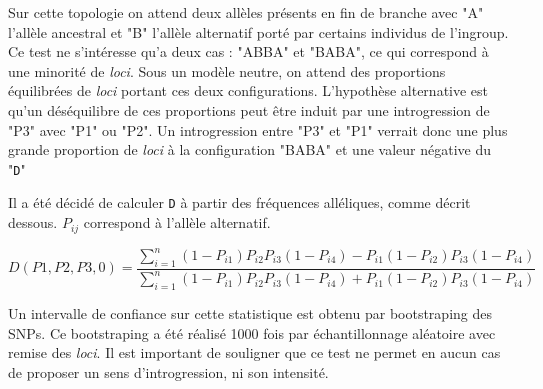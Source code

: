 Sur cette topologie on attend deux allèles présents en fin de branche avec "A" l'allèle ancestral et "B" l'allèle alternatif porté par certains individus de l'ingroup.
 Ce test ne s'intéresse qu'a deux cas : "ABBA" et "BABA", ce qui correspond à une minorité de \textit{loci}. Sous un modèle neutre, on attend des proportions équilibrées de \textit{loci} portant ces deux configurations. L'hypothèse alternative est qu'un déséquilibre de ces proportions peut être induit par une introgression de "P3" avec "P1" ou "P2".
 Un introgression entre "P3" et "P1" verrait donc une plus grande proportion de \textit{loci} à la configuration "BABA" et une valeur négative du "\verb|D|"



Il a été décidé de calculer \verb|D| à partir des fréquences alléliques, comme décrit dessous.
 \textit{$P_{ij}$} correspond à l'allèle alternatif.

\[D(P1,P2,P3,0)=\frac{\sum_{i=1}^{n} (1-P_{i1})P_{i2}P_{i3}(1-P_{i4})-P_{i1}(1-P_{i2})P_{i3}(1-P_{i4})}{\sum_{i=1}^{n} (1-P_{i1})P_{i2}P_{i3}(1-P_{i4})+P_{i1}(1-P_{i2})P_{i3}(1-P_{i4})}\]

Un intervalle de confiance sur cette statistique est obtenu par bootstraping des SNPs.  Ce bootstraping a été réalisé 1000 fois par échantillonnage aléatoire avec remise des \textit{loci}.
Il est important de souligner que ce test ne permet en aucun cas de proposer un sens d'introgression, ni son intensité.

